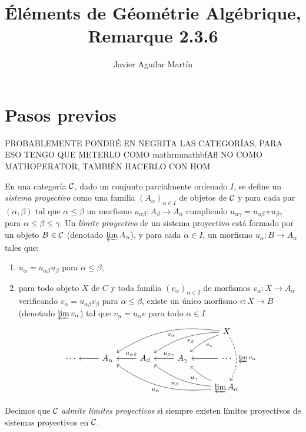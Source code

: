 \documentclass[twoside]{article}
\begin{document}
\title{Éléments de Géométrie Algébrique, Remarque 2.3.6}
\author{Javier Aguilar Martín}
\maketitle

\section{Pasos previos}

PROBABLEMENTE PONDRÉ EN NEGRITA LAS CATEGORÍAS, PARA ESO TENGO QUE METERLO COMO mathrm{mathbf{Aff}} NO COMO MATHOPERATOR, TAMBIÉN HACERLO CON HOM
\begin{defi}[EGA, 0-1.1.9]
En una categoría ${\mathcal C}$, dado un conjunto parcialmente ordenado $I$, se define un \emph{sistema proyectivo} como una familia $(A_\alpha)_{\alpha\in I}$ de objetos de ${\mathcal C}$ y para cada par $(\alpha,\beta)$ tal que $\alpha\leq\beta$ un morfismo $u_{\alpha\beta}:A_\beta\to A_\alpha$ cumpliendo $u_{\alpha\gamma}=u_{\alpha\beta}\circ u_{\beta\gamma}$ para $\alpha\leq\beta\leq\gamma$. Un \emph{límite proyectivo} de un sistema proyectivo está formado por un objeto $B\in{\mathcal C}$ (denotado $\varprojlim A_\alpha$), y para cada $\alpha\in I$, un morfismo $u_\alpha:B\to A_\alpha$ tales que: 
\begin{enumerate}
\item $u_\alpha=u_{\alpha\beta}u_{\beta}$ para $\alpha\leq\beta$;
\item para todo objeto $X$ de $C$ y toda familia $(v_\alpha)_{\alpha\in I}$ de morfismos $v_\alpha:X\to A_{\alpha}$ verificando $v_\alpha=u_{\alpha\beta}v_{\beta}$ para $\alpha\leq\beta$, existe un único morfismo $v:X\to B$ (denotado $\varprojlim v_\alpha$) tal que $v_\alpha=u_\alpha v$ para todo $\alpha\in I$
\[
\begin{tikzcd}
& & & & X\arrow[dlll, bend left=-20, "v_\alpha"]\arrow[dll, bend left=-15, "v_\beta"]\arrow[dl, bend left=-10, "v_\gamma"]\arrow[dd, dashed, bend left, "\varprojlim v_\alpha"]\\
\cdots &A_\alpha\arrow[l]  & A_\beta\arrow[l, "u_{\alpha\beta}"', near start]  & \arrow[l, "u_{\beta\gamma}"', near start]A_\gamma &\cdots\arrow[l]\\
&  & & & \varprojlim A_\alpha\arrow[ulll, bend left=20, "u_\alpha"]\arrow[ull, bend left=15, "u_\beta"]\arrow[ul, bend left=10, "u_\gamma"]
\end{tikzcd}
\]
\end{enumerate}
Decimos que ${\mathcal C}$ \emph{admite límites proyectivos} si siempre existen límites proyectivos de sistemas proyectivos en ${\mathcal C}$. 
\end{defi}
\end{document}
